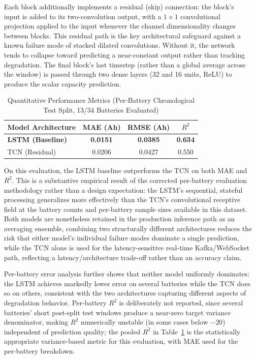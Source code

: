 Each block additionally implements a residual (skip) connection: the block's input is added to its two-convolution output, with a $1\times1$ convolutional projection applied to the input whenever the channel dimensionality changes between blocks. This residual path is the key architectural safeguard against a known failure mode of stacked dilated convolutions. Without it, the network tends to collapse toward predicting a near-constant output rather than tracking degradation. The final block's last timestep (rather than a global average across the window) is passed through two dense layers (32 and 16 units, ReLU) to produce the scalar capacity prediction.

\begin{table}[htbp]
\caption{Quantitative Performance Metrics (Per-Battery Chronological Test Split, 13/34 Batteries Evaluated)}
\begin{center}
\begin{tabular}{|l|c|c|c|}
\hline
\textbf{Model Architecture} & \textbf{MAE (Ah)} & \textbf{RMSE (Ah)} & \textbf{$R^2$} \\
\hline
\textbf{LSTM (Baseline)} & \textbf{0.0151} & \textbf{0.0385} & \textbf{0.634} \\
\hline
TCN (Residual) & 0.0206 & 0.0427 & 0.550 \\
\hline
\end{tabular}
\label{tab:performance}
\end{center}
\end{table}

On this evaluation, the LSTM baseline outperforms the TCN on both MAE and $R^2$. This is a substantive empirical result of the corrected per-battery evaluation methodology rather than a design expectation: the LSTM's sequential, stateful processing generalizes more effectively than the TCN's convolutional receptive field at the battery counts and per-battery sample sizes available in this dataset. Both models are nonetheless retained in the production inference path as an averaging ensemble, combining two structurally different architectures reduces the risk that either model's individual failure modes dominate a single prediction, while the TCN alone is used for the latency-sensitive real-time Kafka/WebSocket path, reflecting a latency/architecture trade-off rather than an accuracy claim.

Per-battery error analysis further shows that neither model uniformly dominates: the LSTM achieves markedly lower error on several batteries while the TCN does so on others, consistent with the two architectures capturing different aspects of degradation behavior. Per-battery $R^2$ is deliberately not reported, since several batteries' short post-split test windows produce a near-zero target variance denominator, making $R^2$ numerically unstable (in some cases below $-20$) independent of prediction quality; the pooled $R^2$ in Table~\ref{tab:performance} is the statistically appropriate variance-based metric for this evaluation, with MAE used for the per-battery breakdown.

